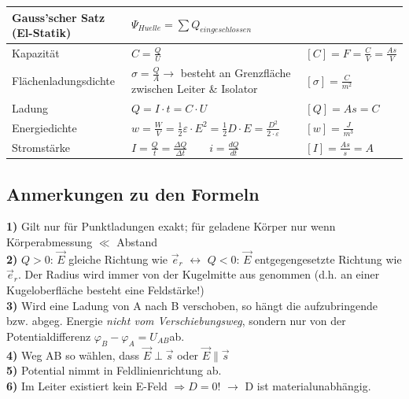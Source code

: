 \begin{tabular}[c]{ | p{4.5cm} | p{9cm} | p{4cm} | }
Gauss'scher Satz (El-Statik) 
	& $ \Psi_{Huelle} = \sum Q_{eingeschlossen} $ 
	& \\
	\hline
	\hline

Kapazität
	& $C = \frac{Q}{U}$
	& $[C] = F = \frac{C}{V} = \frac{As}{V}$ \\
	\hline

Flächenladungsdichte
	& $\sigma = \frac{Q}{A} \rightarrow$ besteht an Grenzfläche zwischen Leiter \& Isolator
	& $ [\sigma] = \frac{C}{m^2} $\\
	\hline

Ladung
	& $Q = I \cdot t = C \cdot U$
	& $[Q] = As = C$ \\
	\hline

Energiedichte
 	& $w=\frac{W}{V} = \frac{1}{2} \varepsilon \cdot E^2 = \frac{1}{2}D\cdot E = \frac{D^2}{2\cdot \varepsilon}$
 	& $[w]=\frac{J}{m^3}$ \\ 
	\hline

Stromstärke    
  	 & $ I =  \frac{Q}{t} = \frac{\Delta Q}{\Delta t}  \qquad i = \frac{dQ}{dt}  $
	 &  $[I]=\frac{As}{s} = A$\\
	\hline

\end{tabular}
\renewcommand{\arraystretch}{1}

\subsection{Anmerkungen zu den Formeln}
	\textbf{1)} Gilt nur für Punktladungen exakt; für geladene Körper nur wenn 
		Körperabmessung $\ll$ Abstand \\
	\textbf{2)} $Q > 0$: $\vec{E}$ gleiche Richtung wie $\vec{e}_r$ $\leftrightarrow$ $Q < 0$: 
		$\vec{E}$ entgegengesetzte Richtung wie $\vec{e}_r$.
		Der Radius wird immer von der Kugelmitte aus genommen (d.h. an einer
		Kugeloberfläche besteht eine Feldstärke!)\\
	\textbf{3)} Wird eine Ladung von A nach B verschoben, so hängt die aufzubringende bzw. 
		abgeg. Energie \textit{nicht vom Verschiebungsweg}, sondern nur von der 
		Potentialdifferenz $\varphi_B - \varphi_A = U_{AB}$ab.\\
	\textbf{4)} Weg AB so wählen, dass $\vec{E} \perp \vec{s}$ oder $\vec{E} \parallel \vec{s}$ 
		\\
	\textbf{5)} Potential nimmt in Feldlinienrichtung ab.\\
	\textbf{6)} Im Leiter existiert kein E-Feld $\Rightarrow D = 0$! $\rightarrow$ D ist 
		materialunabhängig.

